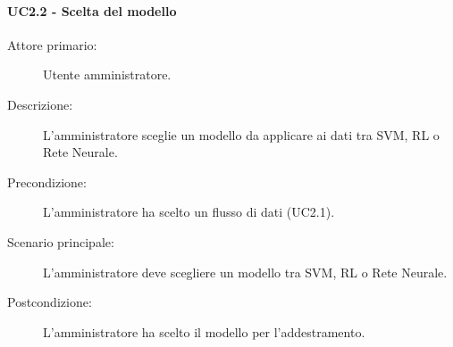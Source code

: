 \paragraph{UC2.2 - Scelta del modello}
\label{sssec:uc2.2}
\begin{description}
  \item[Attore primario:] Utente amministratore.
  \item[Descrizione:] L'amministratore sceglie un modello da applicare ai dati tra SVM, RL o Rete Neurale.
  \item[Precondizione:] L'amministratore ha scelto un flusso di dati (UC2.1).
  \item[Scenario principale:] L'amministratore deve scegliere un modello tra SVM, RL o Rete Neurale.
  \item[Postcondizione:] L'amministratore ha scelto il modello per l'addestramento.
\end{description}
